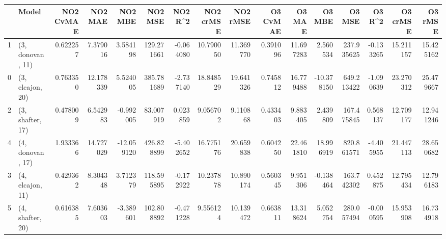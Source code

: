 \begin{tabular}{llrrrrrrrrrrrrrr}
\toprule
{} &             Model &  NO2 CvMAE &    NO2 MAE &    NO2 MBE &     NO2 MSE &   NO2 R\textasciicircum2 &  NO2 crMSE &   NO2 rMSE &  O3 CvMAE &     O3 MAE &     O3 MBE &      O3 MSE &    O3 R\textasciicircum2 &   O3 crMSE &    O3 rMSE \\
\midrule
1 &  (3, donovan, 11) &   0.622257 &   7.379016 &   3.584198 &  129.271661 & -0.064080 &  10.790050 &  11.369770 &  0.391096 &  11.697283 &   2.560534 &  237.935625 & -0.133265 &  15.211157 &  15.425162 \\
0 &  (3, elcajon, 20) &   0.763350 &  12.178339 &   5.524005 &  385.781689 & -2.737140 &  18.848529 &  19.641326 &  0.745812 &  16.779488 & -10.378150 &  649.213422 & -1.090639 &  23.270312 &  25.479667 \\
2 &  (3, shafter, 17) &   0.478009 &   6.542983 &  -0.992005 &   83.007919 &  0.023859 &   9.056702 &   9.110868 &  0.433403 &   9.883405 &   2.439809 &  167.475845 &  0.568137 &  12.709177 &  12.941246 \\
4 &  (4, donovan, 17) &   1.933366 &  14.727029 & -12.059120 &  426.828899 & -5.402652 &  16.775176 &  20.659838 &  0.604250 &  22.461810 &  18.996919 &  820.861571 & -4.405955 &  21.447113 &  28.650682 \\
3 &  (4, elcajon, 11) &   0.429362 &   8.304348 &   3.712379 &  118.595895 & -0.172922 &  10.237878 &  10.890174 &  0.560345 &   9.951306 &  -0.138464 &  163.742302 &  0.452875 &  12.795434 &  12.796183 \\
5 &  (4, shafter, 20) &   0.616385 &   7.603603 &  -3.389601 &  102.808892 & -0.471228 &   9.556124 &  10.139472 &  0.663811 &  13.318624 &   5.052754 &  280.057494 & -0.000595 &  15.953908 &  16.734918 \\
\bottomrule
\end{tabular}
